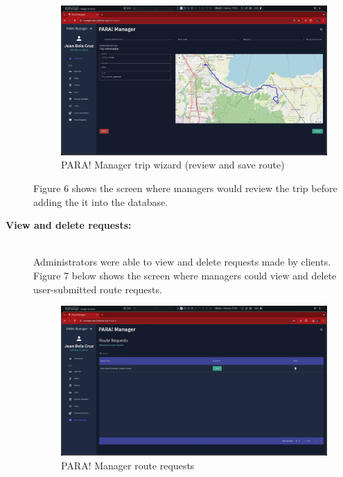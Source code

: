 \documentclass{icsthesis}
\begin{document}
\begin{mainmatter}
\begin{description}
		\begin{figure}[!h]
			\centering
				\includegraphics[scale=0.18]{./figures/manager/trip wizard 4.jpeg}
			\caption{PARA! Manager trip wizard (review and save route)}
		\end{figure}
		
		Figure 6 shows the screen where managers would review the trip before adding the it into the database. \hfill \\

        \newpage

			\item[\textbf{View and delete requests:}] \hfill \\
			   Administrators were able to view and delete requests made by clients.
		Figure 7 below shows the screen where managers could view and delete user-submitted route requests.
		
		\begin{figure}[!h]
			\centering
				\includegraphics[scale=0.15]{./figures/manager/route request.jpeg}
			\caption{PARA! Manager route requests}
		\end{figure}
			

\end{description}
\end{mainmatter}
\end{document}
